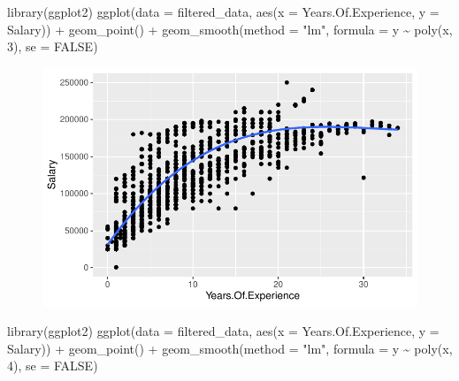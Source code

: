 \documentclass[
  letterpaper,
  DIV=11,
  numbers=noendperiod]{scrartcl}
\newenvironment{Shaded}{\begin{snugshade}}{\end{snugshade}}
\newcommand{\AttributeTok}[1]{\textcolor[rgb]{0.40,0.45,0.13}{#1}}
\newcommand{\ConstantTok}[1]{\textcolor[rgb]{0.56,0.35,0.01}{#1}}
\newcommand{\DecValTok}[1]{\textcolor[rgb]{0.68,0.00,0.00}{#1}}
\newcommand{\FunctionTok}[1]{\textcolor[rgb]{0.28,0.35,0.67}{#1}}
\newcommand{\NormalTok}[1]{\textcolor[rgb]{0.00,0.23,0.31}{#1}}
\newcommand{\SpecialCharTok}[1]{\textcolor[rgb]{0.37,0.37,0.37}{#1}}
\newcommand{\StringTok}[1]{\textcolor[rgb]{0.13,0.47,0.30}{#1}}
\begin{document}
\begin{Shaded}
\begin{Highlighting}[]
\FunctionTok{library}\NormalTok{(ggplot2)}
\FunctionTok{ggplot}\NormalTok{(}\AttributeTok{data =}\NormalTok{ filtered\_data, }\FunctionTok{aes}\NormalTok{(}\AttributeTok{x =}\NormalTok{ Years.Of.Experience, }\AttributeTok{y =}\NormalTok{ Salary)) }\SpecialCharTok{+}
  \FunctionTok{geom\_point}\NormalTok{() }\SpecialCharTok{+}
  \FunctionTok{geom\_smooth}\NormalTok{(}\AttributeTok{method =} \StringTok{"lm"}\NormalTok{, }\AttributeTok{formula =}\NormalTok{ y }\SpecialCharTok{\textasciitilde{}} \FunctionTok{poly}\NormalTok{(x, }\DecValTok{3}\NormalTok{), }\AttributeTok{se =} \ConstantTok{FALSE}\NormalTok{)}
\end{Highlighting}
\end{Shaded}

\begin{figure}[H]

{\centering \includegraphics{main_doc_files/figure-pdf/unnamed-chunk-125-1.pdf}

}

\end{figure}

\begin{Shaded}
\begin{Highlighting}[]
\FunctionTok{library}\NormalTok{(ggplot2)}
\FunctionTok{ggplot}\NormalTok{(}\AttributeTok{data =}\NormalTok{ filtered\_data, }\FunctionTok{aes}\NormalTok{(}\AttributeTok{x =}\NormalTok{ Years.Of.Experience, }\AttributeTok{y =}\NormalTok{ Salary)) }\SpecialCharTok{+}
  \FunctionTok{geom\_point}\NormalTok{() }\SpecialCharTok{+}
  \FunctionTok{geom\_smooth}\NormalTok{(}\AttributeTok{method =} \StringTok{"lm"}\NormalTok{, }\AttributeTok{formula =}\NormalTok{ y }\SpecialCharTok{\textasciitilde{}} \FunctionTok{poly}\NormalTok{(x, }\DecValTok{4}\NormalTok{), }\AttributeTok{se =} \ConstantTok{FALSE}\NormalTok{)}
\end{Highlighting}
\end{Shaded}
\end{document}
